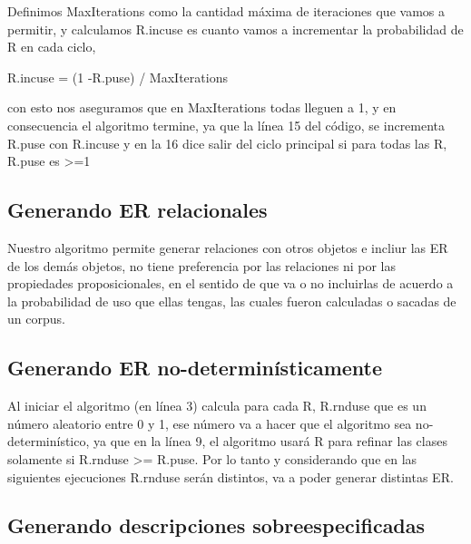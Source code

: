Definimos MaxIterations como la cantidad m\'axima de iteraciones que vamos a permitir, y calculamos R.incuse es cuanto vamos a incrementar la probabilidad de R en cada ciclo, 

R.incuse = (1 -R.puse) / MaxIterations

con esto nos aseguramos que en MaxIterations todas lleguen a 1, y en consecuencia el algoritmo termine, ya que la l\'inea 15 del c\'odigo, se incrementa R.puse con R.incuse y en la 16 dice salir del ciclo principal si para todas las R, R.puse es >=1

\subsection{Generando ER relacionales}

Nuestro algoritmo permite generar relaciones con otros objetos e incliur las ER de los dem\'as objetos, no tiene preferencia por las relaciones ni por las propiedades proposicionales, en el sentido de que va o no incluirlas de acuerdo a la probabilidad de uso que ellas tengas, las cuales fueron calculadas o sacadas de un corpus.

\subsection{Generando ER no-determin\'isticamente}

Al iniciar el algoritmo (en l\'inea 3) calcula para cada R, R.rnduse que es un n\'umero aleatorio entre 0 y 1, ese n\'umero va a hacer que el algoritmo sea no-determin\'istico, ya que en la l\'inea 9, el algoritmo usar\'a R para refinar las clases solamente si 
R.rnduse >= R.puse. Por lo tanto y considerando que en las siguientes ejecuciones R.rnduse ser\'an distintos, va a poder generar distintas ER.

\subsection{Generando descripciones sobreespecificadas}\label{sec:overspecification}


